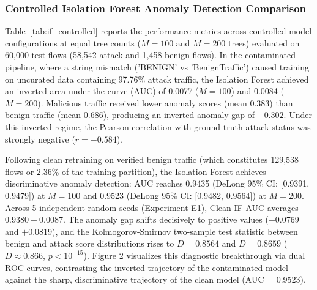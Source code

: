 \documentclass[journal,10pt,onecolumn]{IEEEtran}
\begin{document}
\subsubsection{Controlled Isolation Forest Anomaly Detection Comparison}
Table~\ref{tab:if_controlled} reports the performance metrics across controlled model configurations at equal tree counts ($M=100$ and $M=200$ trees) evaluated on 60,000 test flows (58,542 attack and 1,458 benign flows). In the contaminated pipeline, where a string mismatch ('BENIGN' vs 'BenignTraffic') caused training on uncurated data containing 97.76\% attack traffic, the Isolation Forest achieved an inverted area under the curve (AUC) of 0.0077 ($M=100$) and 0.0084 ($M=200$). Malicious traffic received lower anomaly scores (mean 0.383) than benign traffic (mean 0.686), producing an inverted anomaly gap of $-0.302$. Under this inverted regime, the Pearson correlation with ground-truth attack status was strongly negative ($r = -0.584$).

Following clean retraining on verified benign traffic (which constitutes 129,538 flows or 2.36\% of the training partition), the Isolation Forest achieves discriminative anomaly detection: AUC reaches 0.9435 (DeLong 95\% CI: [0.9391, 0.9479]) at $M=100$ and 0.9523 (DeLong 95\% CI: [0.9482, 0.9564]) at $M=200$. Across 5 independent random seeds (Experiment E1), Clean IF AUC averages $0.9380 \pm 0.0087$. The anomaly gap shifts decisively to positive values ($+0.0769$ and $+0.0819$), and the Kolmogorov-Smirnov two-sample test statistic between benign and attack score distributions rises to $D = 0.8564$ and $D = 0.8659$ ($D \approx 0.866$, $p < 10^{-15}$). Figure 2 visualizes this diagnostic breakthrough via dual ROC curves, contrasting the inverted trajectory of the contaminated model against the sharp, discriminative trajectory of the clean model (AUC = 0.9523).
\end{document}
